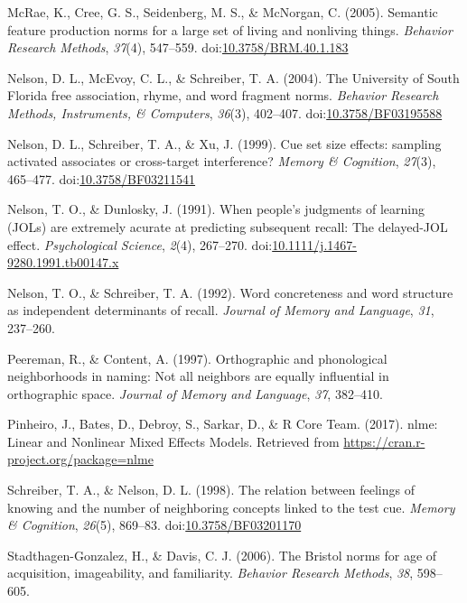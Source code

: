 \documentclass[english,man]{apa6}
\theoremstyle{definition}
\theoremstyle{definition}
\theoremstyle{remark}
\begin{document}
\hypertarget{ref-McRae2005}{}
McRae, K., Cree, G. S., Seidenberg, M. S., \& McNorgan, C. (2005).
Semantic feature production norms for a large set of living and
nonliving things. \emph{Behavior Research Methods}, \emph{37}(4),
547--559.
doi:\href{https://doi.org/10.3758/BRM.40.1.183}{10.3758/BRM.40.1.183}

\hypertarget{ref-Nelson2004}{}
Nelson, D. L., McEvoy, C. L., \& Schreiber, T. A. (2004). The University
of South Florida free association, rhyme, and word fragment norms.
\emph{Behavior Research Methods, Instruments, \& Computers},
\emph{36}(3), 402--407.
doi:\href{https://doi.org/10.3758/BF03195588}{10.3758/BF03195588}

\hypertarget{ref-Nelson1999}{}
Nelson, D. L., Schreiber, T. A., \& Xu, J. (1999). Cue set size effects:
sampling activated associates or cross-target interference? \emph{Memory
\& Cognition}, \emph{27}(3), 465--477.
doi:\href{https://doi.org/10.3758/BF03211541}{10.3758/BF03211541}

\hypertarget{ref-Nelson1991}{}
Nelson, T. O., \& Dunlosky, J. (1991). When people's judgments of
learning (JOLs) are extremely acurate at predicting subsequent recall:
The delayed-JOL effect. \emph{Psychological Science}, \emph{2}(4),
267--270.
doi:\href{https://doi.org/10.1111/j.1467-9280.1991.tb00147.x}{10.1111/j.1467-9280.1991.tb00147.x}

\hypertarget{ref-Nelson1992}{}
Nelson, T. O., \& Schreiber, T. A. (1992). Word concreteness and word
structure as independent determinants of recall. \emph{Journal of Memory
and Language}, \emph{31}, 237--260.

\hypertarget{ref-Peereman1997}{}
Peereman, R., \& Content, A. (1997). Orthographic and phonological
neighborhoods in naming: Not all neighbors are equally influential in
orthographic space. \emph{Journal of Memory and Language}, \emph{37},
382--410.

\hypertarget{ref-Pinheiro2017}{}
Pinheiro, J., Bates, D., Debroy, S., Sarkar, D., \& R Core Team. (2017).
nlme: Linear and Nonlinear Mixed Effects Models. Retrieved from
\url{https://cran.r-project.org/package=nlme}

\hypertarget{ref-Schreiber1998}{}
Schreiber, T. A., \& Nelson, D. L. (1998). The relation between feelings
of knowing and the number of neighboring concepts linked to the test
cue. \emph{Memory \& Cognition}, \emph{26}(5), 869--83.
doi:\href{https://doi.org/10.3758/BF03201170}{10.3758/BF03201170}

\hypertarget{ref-Stadthagen-Gonzalez2006}{}
Stadthagen-Gonzalez, H., \& Davis, C. J. (2006). The Bristol norms for
age of acquisition, imageability, and familiarity. \emph{Behavior
Research Methods}, \emph{38}, 598--605.
\end{document}
